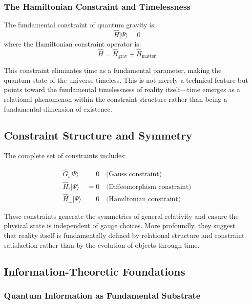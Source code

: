 \documentclass[12pt,a4paper]{article}
\newcommand{\ket}[1]{|#1\rangle}
\newcommand{\op}[1]{\hat{#1}}
\begin{document}
\subsubsection{The Hamiltonian Constraint and Timelessness}

The fundamental constraint of quantum gravity is:
\begin{equation}
    \op{H}\ket{\Psi} = 0
\end{equation}
where the Hamiltonian constraint operator is:
\begin{equation}
    \op{H} = \op{H}_{\text{grav}} + \op{H}_{\text{matter}}
\end{equation}

This constraint eliminates time as a fundamental parameter, making the quantum state of the universe timeless. This is not merely a technical feature but points toward the fundamental timelessness of reality itself—time emerges as a relational phenomenon within the constraint structure rather than being a fundamental dimension of existence.

\subsection{Constraint Structure and Symmetry}

The complete set of constraints includes:

\begin{align}
    \op{G}_i\ket{\Psi} &= 0 \quad \text{(Gauss constraint)} \\
    \op{H}_i\ket{\Psi} &= 0 \quad \text{(Diffeomorphism constraint)} \\
    \op{H}_\perp\ket{\Psi} &= 0 \quad \text{(Hamiltonian constraint)}
\end{align}

These constraints generate the symmetries of general relativity and ensure the physical state is independent of gauge choices. More profoundly, they suggest that reality itself is fundamentally defined by relational structure and constraint satisfaction rather than by the evolution of objects through time.

\subsection{Information-Theoretic Foundations}

\subsubsection{Quantum Information as Fundamental Substrate}
\end{document}
